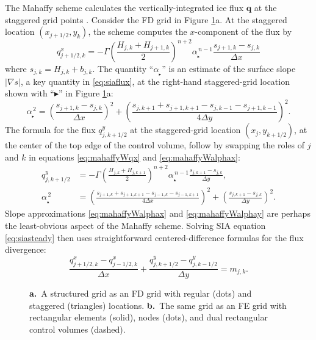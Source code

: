 \documentclass[twocolumn]{igs}
\newcommand\bq{\mathbf{q}}
\newcommand{\grad}{\nabla}
\newcommand\alpharight{\alpha_{{}_{\blacktriangleright}}}
\newcommand\alphaup{\alpha_{{\!}_{\blacktriangle}}}
\begin{document}
The Mahaffy scheme calculates the vertically-integrated ice flux $\bq$ at the staggered grid points \cite[equations (19), (20)]{Mahaffy1976}.  Consider the FD grid in Figure \ref{fig:fdfemgrids}a.  At the staggered location $(x_{j+1/2},y_k)$, the scheme computes the $x$-component of the flux by
\begin{equation}
q^x_{j+1/2,k} = - \Gamma \left(\frac{H_{j,k} + H_{j+1,k}}{2}\right)^{n+2} \alpharight^{\,n-1} \frac{s_{j+1,k} - s_{j,k}}{\Delta x}  \label{eq:mahaffyWqx}
\end{equation}
where $s_{j,k} = H_{j,k} + b_{j,k}$.  The quantity ``$\alpharight$\!'' is an estimate of the surface slope $|\grad s|$, a key quantity in \eqref{eq:siaflux}, at the right-hand staggered-grid location shown with ``$\blacktriangleright$'' in Figure \ref{fig:fdfemgrids}a:
\begin{equation}
\alpharight^{\,2} = \left(\frac{s_{j+1,k} - s_{j,k}}{\Delta x}\right)^2 + \left(\frac{s_{j,k+1} + s_{j+1,k+1} - s_{j,k-1} - s_{j+1,k-1}}{4 \Delta y}\right)^2.  \label{eq:mahaffyWalphax}
\end{equation}
The formula for the flux $q^y_{j,k+1/2}$ at the staggered-grid location $(x_j,y_{k+1/2})$, at the center of the top edge of the control volume, follow by swapping the roles of $j$ and $k$ in equations \eqref{eq:mahaffyWqx} and \eqref{eq:mahaffyWalphax}:
\begin{align}
q^y_{j,k+1/2} &= - \Gamma \left(\frac{H_{j,k} + H_{j,k+1}}{2}\right)^{n+2} \alphaup^{\,n-1} \frac{s_{j,k+1} - s_{j,k}}{\Delta y}, \label{eq:mahaffyWqy} \\
\alphaup^{\,2} &= \left(\frac{s_{j+1,k} + s_{j+1,k+1} - s_{j-1,k} - s_{j-1,k+1}}{4 \Delta x}\right)^2 + \left(\frac{s_{j,k+1} - s_{j,k}}{\Delta y}\right)^2.  \label{eq:mahaffyWalphay}
\end{align}
Slope approximations \eqref{eq:mahaffyWalphax} and \eqref{eq:mahaffyWalphay} are perhaps the least-obvious aspect of the Mahaffy scheme.  Solving SIA equation \eqref{eq:siasteady} then uses straightforward centered-difference formulas \cite{MortonMayers2005} for the flux divergence:
\begin{equation}
\frac{q^x_{j+1/2,k} - q^x_{j-1/2,k}}{\Delta x} + \frac{q^y_{j,k+1/2}- q^y_{j,k-1/2}}{\Delta y} = m_{j,k}.  \label{eq:siasteadyfd}
\end{equation}

\begin{figure}[ht]
\begin{center}
 \quad 
\end{center}
\caption{{\large \textbf{a.}}~A structured grid as an FD grid with regular (dots) and staggered (triangles) locations.  {\large \textbf{b.}}~The same grid as an FE grid with rectangular elements (solid), nodes (dots), and dual rectangular control volumes (dashed).}
\label{fig:fdfemgrids}
\end{figure}
\end{document}
